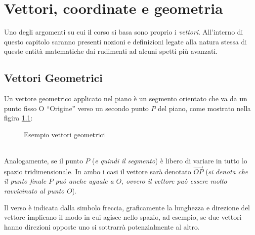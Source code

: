 \chapter{Vettori, coordinate e geometria}
\label{chap:vettcoordegeo}
Uno degli argomenti su cui il corso si basa sono proprio i \textit{vettori}. All'interno di questo capitolo saranno presenti nozioni e definizioni legate alla natura stessa di queste entità matematiche dai rudimenti ad alcuni spetti più avanzati.

\section{Vettori Geometrici}
\label{sec:vettorigeo}
\begin{defi}
  \label{def:vettorigeo}
  Un vettore geometrico applicato nel piano è un segmento orientato che va da un punto fisso O ``Origine'' verso un secondo punto $P$ del piano, come mostrato nella figira \ref{fig:vettorigeo}: 
  \begin{figure}[ht!]
    \centering
    \resizebox{3cm}{!}{
      
    }
    \caption{Esempio vettori geometrici}
    \label{fig:vettorigeo}
  \end{figure}\\
  Analogamente, se il punto $P$ (\textit{e quindi il segmento}) è libero di variare in tutto lo spazio tridimensionale. In ambo i casi il vettore sarà denotato $\vec{OP}$ (\textit{si denota che il punto finale $P$ può anche uguale a $O$, ovvero il vettore può essere molto ravvicinato al punto $O$}).
\end{defi}
\begin{nota}
  \label{nota:vettorigeo}
  Il verso è indicata dalla simbolo freccia, graficamente la lunghezza e direzione del vettore implicano il modo in cui agisce nello spazio, ad esempio, se due vettori hanno direzioni opposte uno si sottrarrà potenzialmente al altro.
\end{nota}


